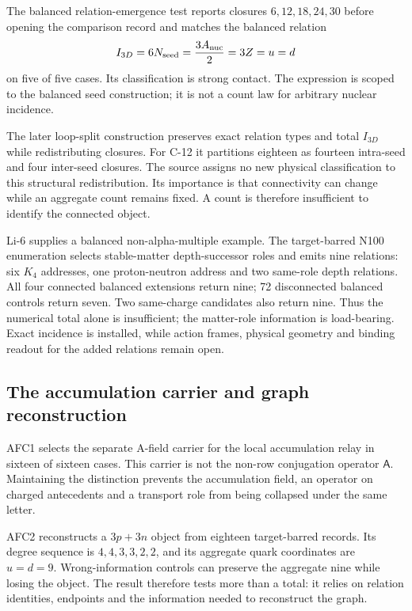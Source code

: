 The balanced relation-emergence test reports closures $6,12,18,24,30$ before opening the comparison record and matches the balanced relation
\begin{equation}
I_{3D}=6N_{\rm seed}=\frac{3A_{\rm nuc}}2=3Z=u=d
\end{equation}
on five of five cases. Its classification is strong contact. The expression is scoped to the balanced seed construction; it is not a count law for arbitrary nuclear incidence.

The later loop-split construction preserves exact relation types and total $I_{3D}$ while redistributing closures. For C-12 it partitions eighteen as fourteen intra-seed and four inter-seed closures. The source assigns no new physical classification to this structural redistribution. Its importance is that connectivity can change while an aggregate count remains fixed. A count is therefore insufficient to identify the connected object.

Li-6 supplies a balanced non-alpha-multiple example. The target-barred N100 enumeration selects stable-matter depth-successor roles and emits nine relations: six $K_4$ addresses, one proton-neutron address and two same-role depth relations. All four connected balanced extensions return nine; 72 disconnected balanced controls return seven. Two same-charge candidates also return nine. Thus the numerical total alone is insufficient; the matter-role information is load-bearing. Exact incidence is installed, while action frames, physical geometry and binding readout for the added relations remain open.\cite{viiatom}

\subsection{The accumulation carrier and graph reconstruction}

AFC1 selects the separate A-field carrier for the local accumulation relay in sixteen of sixteen cases. This carrier is not the non-row conjugation operator $\mathsf A$. Maintaining the distinction prevents the accumulation field, an operator on charged antecedents and a transport role from being collapsed under the same letter.

AFC2 reconstructs a $3p+3n$ object from eighteen target-barred records. Its degree sequence is $4,4,3,3,2,2$, and its aggregate quark coordinates are $u=d=9$. Wrong-information controls can preserve the aggregate nine while losing the object. The result therefore tests more than a total: it relies on relation identities, endpoints and the information needed to reconstruct the graph.

